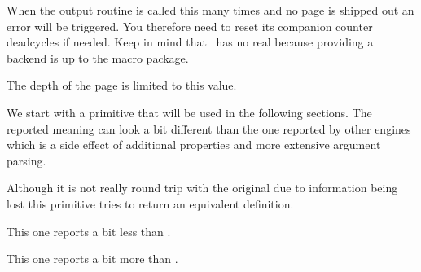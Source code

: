 \stopnewprimitive

\startoldprimitive[title={\prm {maxdeadcycles}}]

When the output routine is called this many times and no page is shipped out an
error will be triggered. You therefore need to reset its companion counter \prm
{deadcycles} if needed. Keep in mind that \LUAMETATEX\ has no real 
because providing a backend is up to the macro package.

\stopoldprimitive

\startoldprimitive[title={\prm {maxdepth}}]

The depth of the page is limited to this value.

\stopoldprimitive

\startoldprimitive[title={\prm {meaning}}]

We start with a primitive that will be used in the following sections. The
reported meaning can look a bit different than the one reported by other engines
which is a side effect of additional properties and more extensive argument
parsing.

\startbuffer
\tolerant\permanent\protected\gdef\foo[#1]#*[#2]{(#1)(#2)} \meaning\foo
\stopbuffer

\typebuffer \getbuffer

\stopoldprimitive

\startnewprimitive[title={\prm {meaningasis}}]

Although it is not really round trip with the original due to information
being lost this primitive tries to return an equivalent definition.

\startbuffer
\tolerant\permanent\protected\gdef\foo[#1]#*[#2]{(#1)(#2)} \meaningasis\foo
\stopbuffer

\typebuffer \getbuffer

\stopnewprimitive

\startnewprimitive[title={\prm {meaningful}}]

This one reports a bit less than .

\startbuffer
\tolerant\permanent\protected\gdef\foo[#1]#*[#2]{(#1)(#2)} \meaningful\foo
\stopbuffer

\typebuffer \getbuffer

\stopnewprimitive

\startnewprimitive[title={\prm {meaningfull}}]

This one reports a bit more than .

\startbuffer
\tolerant\permanent\protected\gdef\foo[#1]#*[#2]{(#1)(#2)} \meaningfull\foo
\stopbuffer

